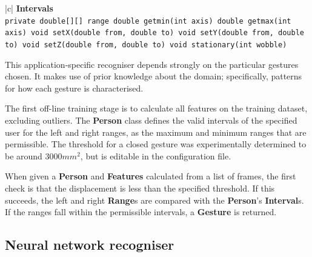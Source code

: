 \documentclass[12pt,a4,notitlepage]{report}
\renewcommand{\_}{\texttt{\symbol{95}}}
\newcommand{\<}{\texttt{\symbol{60}}}
\renewcommand{\>}{\texttt{\symbol{62}}}
\newcommand{\class}[1]{\textbf{#1}}
\newcommand{\variable}[1]{\texttt{#1}}
\begin{document}
\begin{tabular}{|c|} \hline 
\class{Intervals} \\ \hline
{}
{\variable{private double[][] range \newline
  double get\_min(int axis) \newline
  double get\_max(int axis) \newline
  void setX(double from, double to) \newline
  void setY(double from, double to) \newline
  void setZ(double from, double to) \newline
  void stationary(int wobble)
} } \\ \hline
\end{tabular}

This application-specific recogniser depends strongly on the particular gestures chosen. It makes use of prior knowledge about the domain; specifically, patterns for how each gesture is characterised.

The first off-line training stage is to calculate all features on the training dataset, excluding outliers. The \class{Person} class defines the valid intervals of the specified user for the left and right ranges, as the maximum and minimum ranges that are permissible. The threshold for a closed gesture was experimentally determined to be around 3000$mm^2$, but is editable in the configuration file.

When given a \class{Person} and \class{Features} calculated from a list of frames, the first check is that the displacement is less than the specified threshold. If this succeeds, the left and right \class{Range}s are compared with the \class{Person}'s \class{Interval}s. If the ranges fall within the permissible intervals, a \class{Gesture} is returned.

\subsection{Neural network recogniser}
\end{document}
